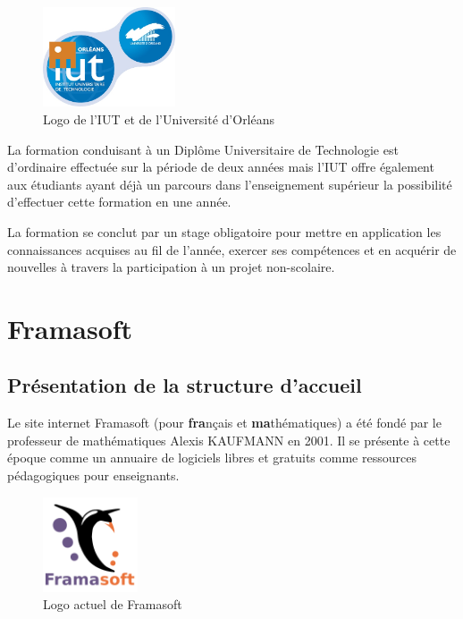 \documentclass[10pt,a4paper, twoside]{report}
\begin{document}
	\begin{figure}[ht]
		\centering
		\includegraphics[width=0.35\textwidth]{images/logo-iut.png}
		\caption{Logo de l'IUT et de l'Université d'Orléans}
		\label{logo-iut}
	\end{figure}
	
	La formation conduisant à un Diplôme Universitaire de Technologie est d'ordinaire effectuée sur la période de deux années mais l'IUT offre également aux étudiants ayant déjà un parcours dans l'enseignement supérieur la possibilité d'effectuer cette formation en une année.
	
	La formation se conclut par un stage obligatoire pour mettre en application les connaissances acquises au fil de l'année, exercer ses compétences et en acquérir de nouvelles à travers la participation à un projet non-scolaire.
	
	\section{Framasoft}
	\subsection{Présentation de la structure d'accueil}
	
	Le site internet Framasoft (pour \textbf{fra}nçais et \textbf{ma}thématiques) a été fondé par le professeur de mathématiques Alexis KAUFMANN en 2001. Il se présente à cette époque comme un annuaire de logiciels libres et gratuits comme ressources pédagogiques pour enseignants.
	
	\begin{figure}[ht]
		\centering
		\includegraphics[width=0.25\textwidth]{images/Framasoft-Logo.png}
		\caption{Logo actuel de Framasoft}
		\label{logo-framasoft}
	\end{figure}
	
\end{document}
